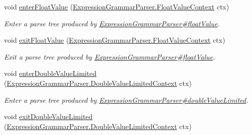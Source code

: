 \begin{DoxyCompactItemize}
void \hyperlink{interfacegov_1_1nasa_1_1jpf_1_1inspector_1_1server_1_1expression_1_1parser_1_1_expression_grammar_listener_aba3972294d216be5bc2b775b837424c6}{enter\+Float\+Value} (\hyperlink{classgov_1_1nasa_1_1jpf_1_1inspector_1_1server_1_1expression_1_1parser_1_1_expression_grammar_parser_1_1_float_value_context}{Expression\+Grammar\+Parser.\+Float\+Value\+Context} ctx)
\begin{DoxyCompactList}\small\item\em Enter a parse tree produced by \hyperlink{classgov_1_1nasa_1_1jpf_1_1inspector_1_1server_1_1expression_1_1parser_1_1_expression_grammar_parser_a135341e27f8ab3d5000295c58d3b9df9}{Expression\+Grammar\+Parser\#float\+Value}. \end{DoxyCompactList}\item 
void \hyperlink{interfacegov_1_1nasa_1_1jpf_1_1inspector_1_1server_1_1expression_1_1parser_1_1_expression_grammar_listener_a94a07b3c96ec122f867972128d3617ef}{exit\+Float\+Value} (\hyperlink{classgov_1_1nasa_1_1jpf_1_1inspector_1_1server_1_1expression_1_1parser_1_1_expression_grammar_parser_1_1_float_value_context}{Expression\+Grammar\+Parser.\+Float\+Value\+Context} ctx)
\begin{DoxyCompactList}\small\item\em Exit a parse tree produced by \hyperlink{classgov_1_1nasa_1_1jpf_1_1inspector_1_1server_1_1expression_1_1parser_1_1_expression_grammar_parser_a135341e27f8ab3d5000295c58d3b9df9}{Expression\+Grammar\+Parser\#float\+Value}. \end{DoxyCompactList}\item 
void \hyperlink{interfacegov_1_1nasa_1_1jpf_1_1inspector_1_1server_1_1expression_1_1parser_1_1_expression_grammar_listener_a2cb37d9f81801deed7bf3add78cab6bb}{enter\+Double\+Value\+Limited} (\hyperlink{classgov_1_1nasa_1_1jpf_1_1inspector_1_1server_1_1expression_1_1parser_1_1_expression_grammar_pa747378014be7c4ab66961e5db1be8d25}{Expression\+Grammar\+Parser.\+Double\+Value\+Limited\+Context} ctx)
\begin{DoxyCompactList}\small\item\em Enter a parse tree produced by \hyperlink{classgov_1_1nasa_1_1jpf_1_1inspector_1_1server_1_1expression_1_1parser_1_1_expression_grammar_parser_a57521cfe69d446d750563c91e30a034c}{Expression\+Grammar\+Parser\#double\+Value\+Limited}. \end{DoxyCompactList}\item 
void \hyperlink{interfacegov_1_1nasa_1_1jpf_1_1inspector_1_1server_1_1expression_1_1parser_1_1_expression_grammar_listener_a138342cc904eaa54867ec37ff78b85c3}{exit\+Double\+Value\+Limited} (\hyperlink{classgov_1_1nasa_1_1jpf_1_1inspector_1_1server_1_1expression_1_1parser_1_1_expression_grammar_pa747378014be7c4ab66961e5db1be8d25}{Expression\+Grammar\+Parser.\+Double\+Value\+Limited\+Context} ctx)

\end{DoxyCompactItemize}
